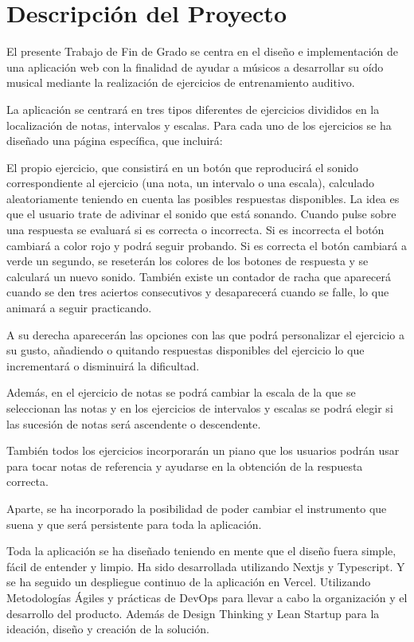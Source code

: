 \documentclass[12pt,twoside,titlepage]{report}
\begin{document}
\section{Descripción del Proyecto}

El presente Trabajo de Fin de Grado se centra en el diseño e implementación de una aplicación web con la finalidad de ayudar a músicos a desarrollar su oído musical mediante la realización de ejercicios de entrenamiento auditivo. 

La aplicación se centrará en tres tipos diferentes de ejercicios divididos en la localización de notas, intervalos y escalas. Para cada uno de los ejercicios se ha diseñado una página específica, que incluirá:

El propio ejercicio, que consistirá en un botón que reproducirá el sonido correspondiente al ejercicio (una nota, un intervalo o una escala), calculado aleatoriamente teniendo en cuenta las posibles respuestas disponibles. La idea es que el usuario trate de adivinar el sonido que está sonando. Cuando pulse sobre una respuesta se evaluará si es correcta o incorrecta. Si es incorrecta el botón cambiará a color rojo y podrá seguir probando. Si es correcta el botón cambiará a verde un segundo, se reseterán los colores de los botones de respuesta y se calculará un nuevo sonido. También existe un contador de racha que aparecerá cuando se den tres aciertos consecutivos y desaparecerá cuando se falle, lo que animará a seguir practicando.

A su derecha aparecerán las opciones con las que podrá personalizar el ejercicio a su gusto, añadiendo o quitando respuestas disponibles del ejercicio lo que incrementará o disminuirá la dificultad. 

Además, en el ejercicio de notas se podrá cambiar la escala de la que se seleccionan las notas y en los ejercicios de intervalos y escalas se podrá elegir si las sucesión de notas será ascendente o descendente. 

También todos los ejercicios incorporarán un piano que los usuarios podrán usar para tocar notas de referencia y ayudarse en la obtención de la respuesta correcta. 

Aparte, se ha incorporado la posibilidad de poder cambiar el instrumento que suena y que será persistente para toda la aplicación.

Toda la aplicación se ha diseñado teniendo en mente que el diseño fuera simple, fácil de entender y limpio. Ha sido desarrollada utilizando Nextjs y Typescript. Y se ha seguido un despliegue continuo de la aplicación en Vercel. Utilizando Metodologías Ágiles y prácticas de DevOps para llevar a cabo la organización y el desarrollo del producto. Además de Design Thinking y Lean Startup para la ideación, diseño y creación de la solución.
\end{document}
